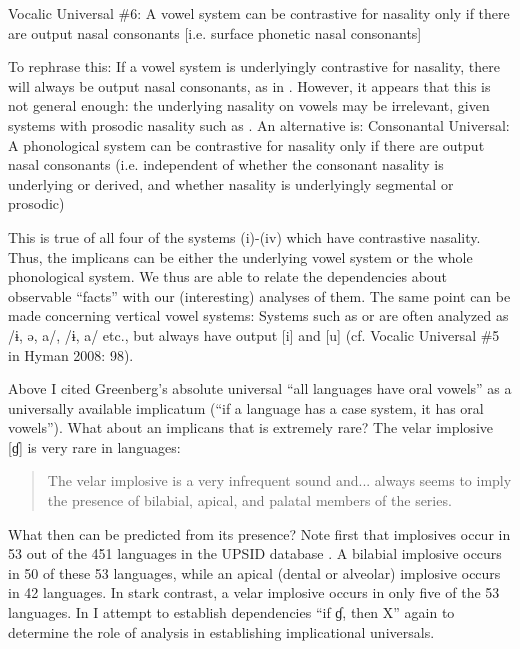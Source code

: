 \documentclass[output=paper]{langsci/langscibook}
\begin{document}
\ea
Vocalic Universal \#6: A vowel system can be contrastive for nasality only if there are output nasal consonants [i.e. surface phonetic nasal consonants] \citep[99]{Hyman2008}
\z


 To rephrase this: If a vowel system is underlyingly contrastive for nasality, there will always be output nasal consonants, as in . However, it appears that this is not general enough: the underlying nasality on vowels may be irrelevant, given systems with prosodic nasality such as . An alternative is:  
\ea
Consonantal Universal: A phonological system can be contrastive for nasality only if there are output nasal consonants (i.e. independent of whether the consonant nasality is underlying or derived, and whether nasality is underlyingly segmental or prosodic)
\z

This is true of all four of the systems (i)-(iv) which have contrastive nasality. Thus, the implicans can be either the underlying vowel system or the whole phonological system. We thus are able to relate the dependencies about observable “facts” with our (interesting) analyses of them. The same point can be made concerning vertical vowel systems: Systems such as  or  are often analyzed as /ɨ, ə, a/, /ɨ, a/ etc., but always have output [i] and [u] (cf. Vocalic Universal \#5 in Hyman 2008: 98).

  Above I cited Greenberg’s absolute universal “all languages have oral vowels” as a universally available implicatum (“if a language has a case system, it has oral vowels”). What about an implicans that is extremely rare? The velar implosive [ɠ] is very rare in languages:

\begin{quote}
The velar implosive is a very infrequent sound and... always seems to imply the presence of bilabial, apical, and palatal members of the series. \citep[128]{Greenberg1970}
\end{quote}


What then can be predicted from its presence? Note first that implosives occur in 53 out of the 451 languages in the UPSID database \citep{Maddieson1990}. A bilabial implosive occurs in 50 of these 53 languages, while an apical (dental or alveolar) implosive occurs in 42 languages. In stark contrast, a velar implosive occurs in only five of the 53 languages. In  I attempt to establish dependencies “if ɠ, then X” again to determine the role of analysis in establishing implicational universals.
\end{document}

